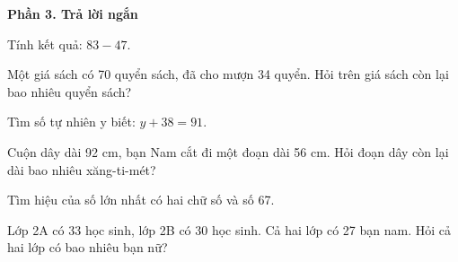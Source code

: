 \textbf{Phần 3. Trả lời ngắn}

\begin{ex} %
Tính kết quả: $83 - 47$.
\end{ex}

\begin{ex} %
Một giá sách có 70 quyển sách, đã cho mượn 34 quyển. Hỏi trên giá sách còn lại bao nhiêu quyển sách?
\end{ex}

\begin{ex} %
Tìm số tự nhiên y biết: $y + 38 = 91$.
\end{ex}

\begin{ex} %
Cuộn dây dài 92 cm, bạn Nam cắt đi một đoạn dài 56 cm. Hỏi đoạn dây còn lại dài bao nhiêu xăng-ti-mét?
\end{ex}

\begin{ex} %
Tìm hiệu của số lớn nhất có hai chữ số và số 67.
\end{ex}

\begin{ex} %
Lớp 2A có 33 học sinh, lớp 2B có 30 học sinh. Cả hai lớp có 27 bạn nam. Hỏi cả hai lớp có bao nhiêu bạn nữ?
\end{ex}

